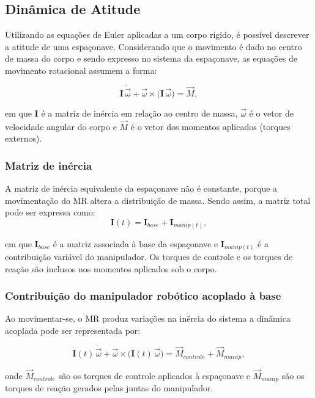 \subsection{Dinâmica de Atitude}
Utilizando as equações de Euler aplicadas a um corpo rígido, é possível descrever a atitude de uma espaçonave. 
Considerando que o movimento é dado no centro de massa do corpo e sendo expresso no sistema da espaçonave, as equações de movimento rotacional assumem a forma:

\begin{equation}
\mathbf{I}\,\dot{\vec{\omega}}
+ \vec{\omega}
\times \big(\mathbf{I}\,\vec{\omega}\big)
= \vec{M},
\label{eq:euler_corpo_rigido}
\end{equation}

em que $\mathbf{I}$ é a matriz de inércia em relação ao centro de massa, $\vec{\omega}$ é o vetor de velocidade angular do corpo e $\vec{M}$ é o vetor dos momentos aplicados (torques externos).

\subsubsection{Matriz de inércia}
A matriz de inércia equivalente da espaçonave não é constante, porque a movimentação do MR altera a distribuição de massa.
Sendo assim, a matriz total pode ser expressa como:
\begin{equation}
\mathbf{I}(t)
= \mathbf{I}_{base}
+ \mathbf{I}_{manip(t)},
\label{eq:inercia_total}
\end{equation}

em que $\mathbf{I}_{base}$ é a matriz associada à base da espaçonave e $\mathbf{I}_{manip(t)}$ é a contribuição variável do manipulador.
Os torques de controle e os torques de reação são inclusos nos momentos aplicados sob o corpo.

\subsubsection{Contribuição do manipulador robótico acoplado à base}
Ao movimentar-se, o MR produz variações na inércia do sistema a dinâmica acoplada pode ser representada por:

\begin{equation}
\mathbf{I}(t)\,\dot{\vec{\omega}}
+ \vec{\omega}
\times \big(\mathbf{I}(t)\,\vec{\omega}\big) 
=
\vec{M}_{controle}
+ \vec{M}_{manip},
\label{eq:dinamica_acoplada}
\end{equation}

onde $\vec{M}_{controle}$ são os torques de controle aplicados à espaçonave e $\vec{M}_{manip}$ são os torques de reação gerados pelas juntas do manipulador.  
